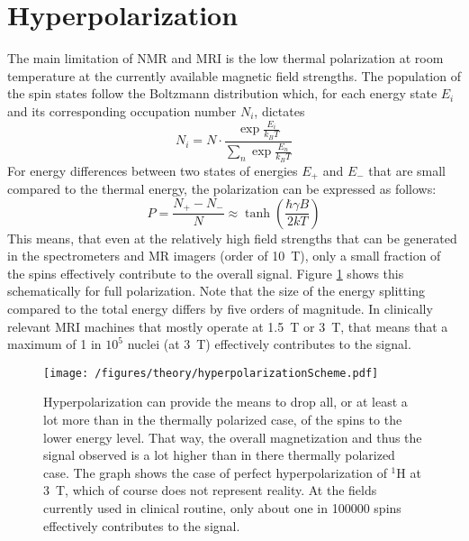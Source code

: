     \section{Hyperpolarization}
    \label{sec:theory:HP}
        The main limitation of NMR and MRI is the low thermal polarization at room temperature at the currently available magnetic field strengths. The population of the spin states follow the Boltzmann distribution \cite{canet_para-hydrogen_2006} which, for each energy state $E_i$ and its corresponding occupation number $N_i$, dictates
        \begin{equation}
            N_i = N \cdot\frac{\exp{\frac{E_i}{k_B T}}}{\sum_n\exp{\frac{E_n}{k_BT}}}
        \end{equation}
        For energy differences between two states of energies $E_+$ and $E_-$ that are small compared to the thermal energy, the polarization can be expressed as follows:
        \begin{equation}
            P = \frac{N_+-N_-}{N} \approx \tanh\left(\frac{\hbar \gamma B}{2 k T }\right)
            \label{equation:theory:polarization}
        \end{equation}
        This means, that even at the relatively high field strengths that can be generated in the spectrometers and MR imagers (order of \SI{10}{\tesla}), only a small fraction of the spins effectively contribute to the overall signal. Figure \ref{figure:theory:boltzmannDistribution} shows this schematically for full polarization. Note that the size of the energy splitting compared to the total energy differs by five orders of magnitude. In clinically relevant MRI machines that mostly operate at \SI{1.5}{\tesla} or \SI{3}{\tesla}, that means that a maximum of 1 in $10^5$ nuclei (at \SI{3}{\tesla}) effectively contributes to the signal.
        \begin{figure}
            \centering
            \texttt{[image: /figures/theory/hyperpolarizationScheme.pdf]}
            \caption[Hyperpolarization scheme]{Hyperpolarization can provide the means to drop all, or at least a lot more than in the thermally polarized case, of the spins to the lower energy level. That way, the overall magnetization and thus the signal observed is a lot higher than in there thermally polarized case. The graph shows the case of perfect hyperpolarization of $^{1}$H at \SI{3}{\tesla}, which of course does not represent reality. At the fields currently used in clinical routine, only about one in 100000 spins effectively contributes to the signal.}
            \label{figure:theory:boltzmannDistribution}
        \end{figure}
